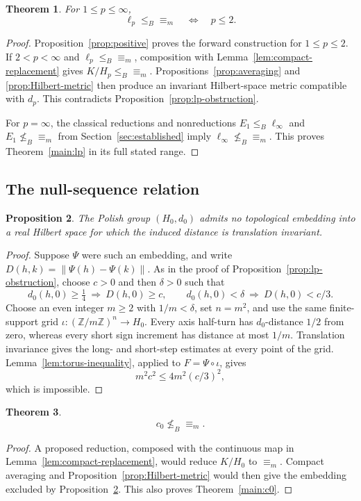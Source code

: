 \documentclass[11pt]{article}
\numberwithin{equation}{section}
\newtheorem{theorem}{Theorem}[section]
\newtheorem{proposition}[theorem]{Proposition}
\theoremstyle{definition}
\newcommand{\Z}{\mathbb Z}
\newcommand{\ME}{\mathrel{\equiv_m}}
\newcommand{\leB}{\mathrel{\leq_B}}
\newcommand{\nleB}{\mathrel{\nleq_B}}
\begin{document}
\begin{theorem}\label{thm:lp}
For $1\le p\leq\infty$,
\[
 \ell_p\leB\ME\quad\Longleftrightarrow\quad p\le2.
\]
\end{theorem}
\begin{proof}
Proposition~\ref{prop:positive} proves the forward construction for
$1\le p\le2$. If $2<p<\infty$ and $\ell_p\leB\ME$, composition with
Lemma~\ref{lem:compact-replacement} gives $K/H_p\leB\ME$.
Propositions~\ref{prop:averaging} and \ref{prop:Hilbert-metric} then
produce an invariant Hilbert-space metric compatible with $d_p$.
This contradicts Proposition~\ref{prop:lp-obstruction}.

For $p=\infty$, the classical reductions and nonreductions
$E_1\leq_B\ell_\infty$ and $E_1\nleq_B{\equiv_m}$
from Section~\ref{sec:established} imply
$\ell_\infty\nleq_B{\equiv_m}$.
This proves Theorem~\ref{main:lp} in its full stated range.
\end{proof}

\subsection{The null-sequence relation}
\begin{proposition}\label{prop:c0-obstruction}
The Polish group $(H_0,d_0)$ admits no topological embedding into a real
Hilbert space for which the induced distance is translation invariant.
\end{proposition}
\begin{proof}
Suppose $\Psi$ were such an embedding, and write
$D(h,k)=\|\Psi(h)-\Psi(k)\|$. As in the proof of
Proposition~\ref{prop:lp-obstruction}, choose $c>0$ and then $\delta>0$
such that
\[
 d_0(h,0)\ge\tfrac14\ \Longrightarrow\ D(h,0)\ge c,
 \qquad
 d_0(h,0)<\delta\ \Longrightarrow\ D(h,0)<c/3.
\]
Choose an even integer $m\ge2$ with $1/m<\delta$, set $n=m^2$, and
use the same finite-support grid $\iota:(\Z/m\Z)^n\to H_0$.
Every axis half-turn has $d_0$-distance $1/2$ from zero, whereas every
short sign increment has distance at most $1/m$. Translation invariance
gives the long- and short-step estimates at every point of the grid.
Lemma~\ref{lem:torus-inequality}, applied to $F=\Psi\circ\iota$, gives
\[
 m^2c^2\le 4m^2(c/3)^2,
\]
which is impossible.
\end{proof}

\begin{theorem}\label{thm:c0}
\[
 c_0\nleB\ME.
\]
\end{theorem}
\begin{proof}
A proposed reduction, composed with the continuous map in
Lemma~\ref{lem:compact-replacement}, would reduce $K/H_0$ to $\ME$.
Compact averaging and Proposition~\ref{prop:Hilbert-metric} would then
give the embedding excluded by Proposition~\ref{prop:c0-obstruction}.
This also proves Theorem~\ref{main:c0}.
\end{proof}
\end{document}
